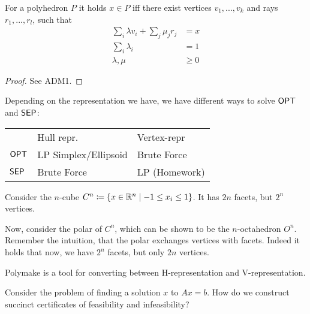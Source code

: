 \begin{theorem}[Minkowski]
    For a polyhedron $P$ it holds $x \in P$ iff there exist vertices $v_1,...,v_k$
    and rays $r_1, ..., r_l$, such that
    \begin{align*}
        \sum_i \lambda v_i + \sum_j \mu_j r_j & = x    \\
        \sum_i \lambda_i                      & = 1    \\
        \lambda, \mu                          & \geq 0
    \end{align*}
\end{theorem}
\begin{proof}
    See ADM1.
\end{proof}
\begin{conclusion}
    Depending on the representation we have, we have different ways to solve $\mathsf{OPT}$ and $\mathsf{SEP}$:

    \begin{tabular}{lll}
                                    & Hull repr.                                & Vertex-repr                        \\ \cline{2-3}
        \multicolumn{1}{l|}{$\mathsf{OPT}$} & \multicolumn{1}{l|}{LP Simplex/Ellipsoid} & \multicolumn{1}{l|}{Brute Force}   \\ \cline{2-3}
        \multicolumn{1}{l|}{$\mathsf{SEP}$} & \multicolumn{1}{l|}{Brute Force}          & \multicolumn{1}{l|}{LP (Homework)} \\ \cline{2-3}
    \end{tabular}
\end{conclusion}
\begin{example}
    Consider the $n$-cube $C^n \coloneqq \{x \in \mathbb{R}^n \mid -1 \leq x_i \leq 1\}$.
    It has $2n$ facets, but $2^n$ vertices.

    Now, consider the polar of $C^n$, which can be shown to be the $n$-octahedron $O^n$.
    Remember the intuition, that the polar exchanges vertices with facets. Indeed it holds that
    now, we have $2^n$ facets, but only $2n$ vertices.
\end{example}
\begin{info}
    Polymake is a tool for converting between H-representation and V-representation.
\end{info}
\begin{question}
    Consider the problem of finding a solution $x$ to $Ax=b$.
    How do we construct succinct certificates of feasibility and infeasibility?
\end{question}
